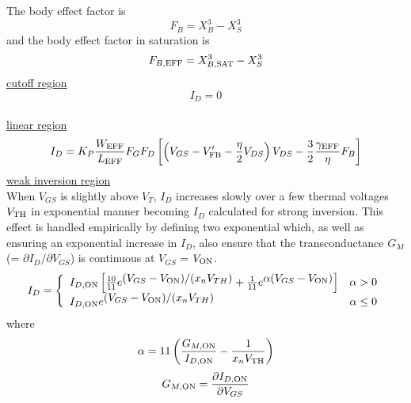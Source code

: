 {The body effect factor is
\begin{equation}
F_B = X^3_B - X^3_S
\end{equation}
and the body effect factor in saturation is
\begin{equation}
F_{B,\mbox{\scriptsize EFF}} = X^3_{B,\mbox{\scriptsize SAT}} - X^3_S
\end{equation}
\underline{cutoff region}
\begin{equation}
I_{D} = 0
\end{equation}\\[0.2in]
%
%
\noindent\underline{linear region}
\begin{equation}
 I_{D} =  K_P {{W_{\mbox{\scriptsize EFF}}}\over{ L_{\mbox{\scriptsize EFF}}}} F_G F_D
           \left[ \left( V_{GS} - V'_{\mbox{\scriptsize FB}}
           - {{\textstyle \eta}\over{\textstyle 2}} V_{DS}
	   \right) V_{DS}
           - {{\textstyle 3}\over{\textstyle 2}}
           {{\textstyle\gamma_{\mbox{\scriptsize EFF}}}\over{\textstyle \eta}} F_B
           \right]
      \label{mos2linearids}
\end{equation}
%
%
\underline{weak inversion region}
\\[0.1in]
When $V_{GS}$ is slightly above $V_T$, $I_{D}$ increases slowly over a few
thermal voltages $V_{\mbox{\scriptsize TH}}$ in
exponential manner becoming $I_{D}$ calculated for strong inversion.
This effect is handled empirically by defining two exponential which,
as well as ensuring an exponential increase in $I_{D}$, also ensure that
the transconductance $G_M$ (= $\partial I_{D}/\partial V_{GS}$) is
continuous at $V_{GS}$ = $V_{\mbox{\scriptsize ON}}$.
\begin{equation}
I_{D} = \left\{ \begin{array}{ll}
         I_{D,\ms{ON}} \left[ {{10}\over{11}} e^{\textstyle
                     (V_{GS}-V_{\ms{ON}})/(x_nV_{TH})}
       + {{1}\over{11}} e^{\textstyle \alpha (V_{GS}-V_{\ms{ON}})} \right]
          &  \alpha > 0 \\
         I_{D,\ms{ON}} e^{\textstyle (V_{GS}-V_{\ms{ON}})/(x_nV_{TH})}
         &  \alpha \le 0 
         \end{array} \right. %
\end{equation}
where
\begin{equation}
\alpha=11\left({{\textstyle G_{M,\mbox{\scriptsize ON}}}\over {\textstyle I_{D,\mbox{\scriptsize ON}}}}
       -{{\textstyle 1}\over {\textstyle x_nV_{\mbox{\scriptsize TH}}}}\right)
\end{equation}
\begin{equation}
G_{M,\ms{ON}} = {{\partial I_{D,\ms{ON}}} \over {\partial V_{GS}}}

\end{equation}}
